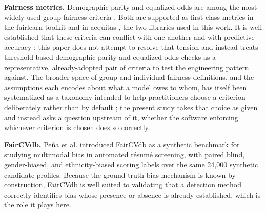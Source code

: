 \documentclass[]{einformatica}
\begin{document}
\textbf{Fairness metrics.} Demographic parity and equalized odds are among the most widely used group fairness criteria \cite{Hardt2016,Dwork2012,Barocas2023}. Both are supported as first-class metrics in the fairlearn toolkit \cite{Bird2020} and in aequitas \cite{Saleiro2018}, the two libraries used in this work. It is well established that these criteria can conflict with one another and with predictive accuracy \cite{Kleinberg2017,Chouldechova2017}; this paper does not attempt to resolve that tension and instead treats threshold-based demographic parity and equalized odds checks as a representative, already-adopted pair of criteria to test the engineering pattern against. The broader space of group and individual fairness definitions, and the assumptions each encodes about what a model owes to whom, has itself been systematized as a taxonomy intended to help practitioners choose a criterion deliberately rather than by default \cite{Verma2018}; the present study takes that choice as given and instead asks a question upstream of it, whether the software enforcing whichever criterion is chosen does so correctly.

\textbf{FairCVdb.} Pe\~na et al. \cite{Pena2020} introduced FairCVdb as a synthetic benchmark for studying multimodal bias in automated r\'esum\'e screening, with paired blind, gender-biased, and ethnicity-biased scoring labels over the same 24,000 synthetic candidate profiles. Because the ground-truth bias mechanism is known by construction, FairCVdb is well suited to validating that a detection method correctly identifies bias whose presence or absence is already established, which is the role it plays here.
\end{document}
